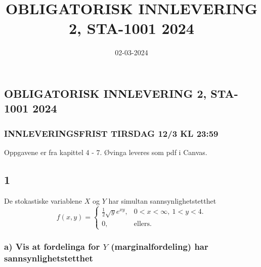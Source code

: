 \documentclass[
  12pt,
  a4paper,
  DIV=11,
  numbers=noendperiod]{scrartcl}
\title{OBLIGATORISK INNLEVERING 2, STA-1001 2024}
\author{}
\date{02-03-2024}
\renewcommand*\contentsname{Table of contents}
\newcommand\contentsname{Table of contents}
\begin{document}
\maketitle
\begin{abstract}
\hfill\break
\hfill\break
\hfill\break
\hfill\break
\hfill\break
\hfill\break
\hfill\break
\hfill\break
\hfill\break
\hfill\break
\hfill\break
\hfill\break
\hfill\break
\hfill\break
\hfill\break
\hfill\break
\hfill\break
\hfill\break
\hfill\break
\hfill\break
\hfill\break
\hfill\break
\hfill\break
\hfill\break
\hfill\break
\hfill\break
\hfill\break
\hfill\break
\hfill\break
\hfill\break
\hfill\break
\end{abstract}

\renewcommand*\contentsname{Innholdsfortegnelse}
{
\hypersetup{linkcolor=black}
\setcounter{tocdepth}{3}
\tableofcontents
}
\newpage

\subsection{OBLIGATORISK INNLEVERING 2, STA-1001
2024}\label{obligatorisk-innlevering-2-sta-1001-2024}

\subsubsection{INNLEVERINGSFRIST TIRSDAG 12/3 KL
23:59}\label{innleveringsfrist-tirsdag-123-kl-2359}

Oppgavene er fra kapittel 4 - 7. Øvinga leveres som pdf i Canvas.

\subsection{1}\label{section}

De stokastiske variablene \(X\) og \(Y\) har simultan
sannsynlighetstetthet \[
f(x,y) = 
\begin{cases}
\frac{1}{2} \sqrt y e^{xy}, & 0 < x < \infty, \ 1 < y < 4. \\
0, & \text{ellers}.
\end{cases}
\]

\subsubsection{\texorpdfstring{a) Vis at fordelinga for \(Y\)
(marginalfordeling) har
sannsynlighetstetthet}{a) Vis at fordelinga for Y (marginalfordeling) har sannsynlighetstetthet}}\label{a-vis-at-fordelinga-for-y-marginalfordeling-har-sannsynlighetstetthet}
\end{document}
